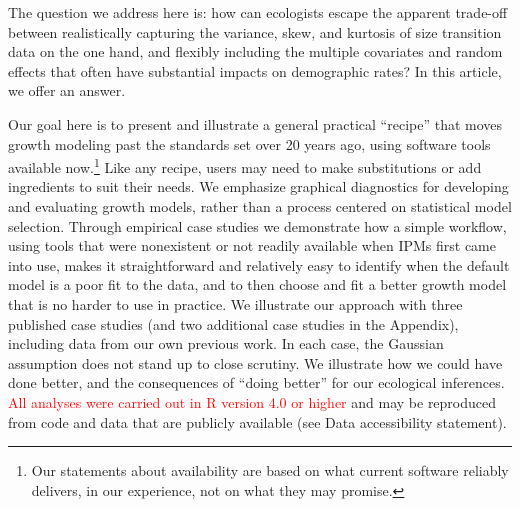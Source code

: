 \documentclass[12pt]{article}
\newcommand{\new}{\textcolor{red}}
\begin{document}
The question we address here is: how can ecologists escape the apparent trade-off between realistically capturing the variance, skew, and kurtosis of size transition data on the one hand, and flexibly including the multiple covariates and random effects that often have substantial impacts on demographic rates?  
In this article, we offer an answer. 

Our goal here is to present and illustrate a general practical ``recipe'' that moves growth modeling past the standards set over 20 years ago, using software tools available now.\footnote{Our statements about availability are based on what current software reliably delivers, in our experience, not on what they may promise.} 
Like any recipe, users may need to make substitutions or add ingredients to suit their needs. 
We emphasize graphical diagnostics for developing and evaluating growth models, rather than a process centered on statistical model selection. 
Through empirical case studies we demonstrate how a simple workflow, using tools that were nonexistent or not readily available when IPMs first came into use, makes it straightforward and relatively easy to identify when the default model is a poor fit to the data, and to then choose and fit a better growth model that is no harder to use in practice. 
We illustrate our approach with three published case studies (and two additional case studies in the Appendix), including data from our own previous work.
In each case, the Gaussian assumption does not stand up to close scrutiny. 
We illustrate how we could have done better, and the consequences of ``doing better'' for our ecological inferences. 
\new{All analyses were carried out in R \citep{r-core} version 4.0 or higher} and may be reproduced from code and data that are 
publicly available (see Data accessibility statement). 
\end{document}
